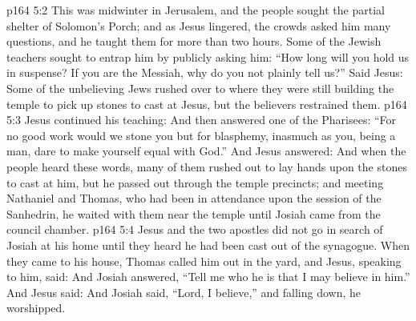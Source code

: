 \vs p164 5:2 This was midwinter in Jerusalem, and the people sought the partial shelter of Solomon’s Porch; and as Jesus lingered, the crowds asked him many questions, and he taught them for more than two hours. Some of the Jewish teachers sought to entrap him by publicly asking him: “How long will you hold us in suspense? If you are the Messiah, why do you not plainly tell us?” Said Jesus:  Some of the unbelieving Jews rushed over to where they were still building the temple to pick up stones to cast at Jesus, but the believers restrained them.
\vs p164 5:3 Jesus continued his teaching:  And then answered one of the Pharisees: “For no good work would we stone you but for blasphemy, inasmuch as you, being a man, dare to make yourself equal with God.” And Jesus answered:  And when the people heard these words, many of them rushed out to lay hands upon the stones to cast at him, but he passed out through the temple precincts; and meeting Nathaniel and Thomas, who had been in attendance upon the session of the Sanhedrin, he waited with them near the temple until Josiah came from the council chamber.
\vs p164 5:4 Jesus and the two apostles did not go in search of Josiah at his home until they heard he had been cast out of the synagogue. When they came to his house, Thomas called him out in the yard, and Jesus, speaking to him, said:  And Josiah answered, “Tell me who he is that I may believe in him.” And Jesus said:  And Josiah said, “Lord, I believe,” and falling down, he worshipped.
